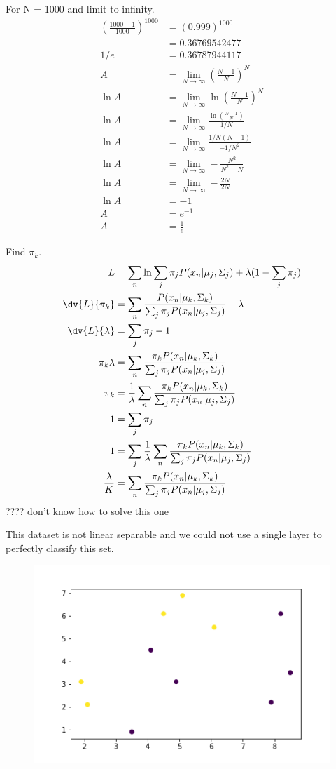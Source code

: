 \documentclass[newpage]{homework}
\begin{document}
For N = 1000 and limit to infinity.
\begin{align*}
    \left(\frac{1000-1}{1000}\right)^{1000}
    &=	(0.999)^{1000}	\\
    &=  0.36769542477   \\
    1/e &=  0.36787944117   \\
    A   &=  \lim_{N\to\infty} \left(\frac{N-1}{N}\right)^N  \\ 
    \ln A   &=\lim_{N\to\infty}  \ln \left(\frac{N-1}{N}\right)^N  \\ 
    \ln A   &=\lim_{N\to\infty}   \frac{\ln \left(\frac{N-1}{N}\right)}{1/N}   \\ 
    \ln A   &=\lim_{N\to\infty}   \frac{1/N(N-1)}{-1/N^2}   \\ 
    \ln A   &=\lim_{N\to\infty}   -\frac{N^2}{N^2-N}   \\ 
    \ln A   &=\lim_{N\to\infty}   -\frac{2N}{2N}   \\
    \ln A   &=  -1   \\
    A       &=  e^{-1}  \\
    A       &=  \frac{1}{e}
\end{align*}    


\question
Find $\pi_k$.
\begin{align*}
    L	&=	\sum_n \ln{\sum_j \pi_j P(x_n|\mu_j,\Sigma_j)}	+ \lambda(1 - \sum_j \pi_j) \\
    \dv{L}{\pi_k}   &=  \sum_n \frac{P(x_n|\mu_k,\Sigma_k)}{\sum_j \pi_j P(x_n|\mu_j,\Sigma_j)} - \lambda	\\
    \dv{L}{\lambda} &=  \sum_j \pi_j - 1    \\
    \pi_k \lambda &= \sum_n \frac{\pi_k P(x_n|\mu_k,\Sigma_k)}{\sum_j \pi_j P(x_n|\mu_j,\Sigma_j)}  \\
    \pi_k &= \frac{1}{\lambda} \sum_n \frac{\pi_k P(x_n|\mu_k,\Sigma_k)}{\sum_j \pi_j P(x_n|\mu_j,\Sigma_j)}    \\
    1   &=  \sum_j \pi_j    \\
    1   &=  \sum_j \frac{1}{\lambda} \sum_n \frac{\pi_k P(x_n|\mu_k,\Sigma_k)}{\sum_j \pi_j P(x_n|\mu_j,\Sigma_j)}  \\
    \frac{\lambda}{K}&=  \sum_n \frac{\pi_k P(x_n|\mu_k,\Sigma_k)}{\sum_j \pi_j P(x_n|\mu_j,\Sigma_j)}  \\
\end{align*}
???? don't know how to solve this one


\question
This dataset is not linear separable and we could not use a single layer to perfectly classify this set.
\begin{figure}[htbp]
    \centering
    \includegraphics[width=\textwidth]{6a.png}
\end{figure}
\end{document}
